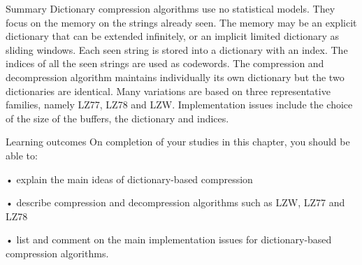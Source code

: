 Summary
Dictionary compression algorithms use no statistical models. They focus on the memory on the strings already seen. The memory may be an explicit dictionary that can be extended infinitely, or an implicit limited dictionary as sliding windows. Each seen string is stored into a dictionary with an index. The indices of all the seen strings are used as codewords. The compression and decompression algorithm maintains individually its own dictionary but the two dictionaries are identical. Many variations are based on three representative families, namely LZ77, LZ78 and LZW. Implementation issues include the choice of the size of the buffers, the dictionary and indices.

Learning outcomes
On completion of your studies in this chapter, you should be able to:

• explain the main ideas of dictionary-based compression

• describe compression and decompression algorithms such as LZW, LZ77 and LZ78

• list and comment on the main implementation issues for dictionary-based compression algorithms.